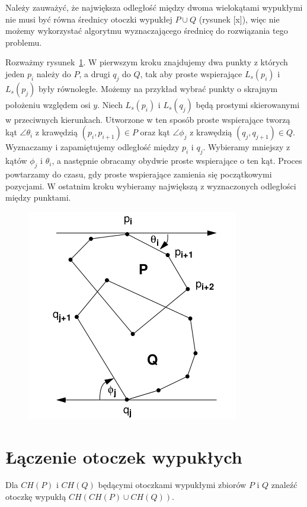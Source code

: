 Należy zauważyć, że największa odległość między dwoma wielokątami
wypukłymi nie musi być równa średnicy otoczki wypukłej $P \cup Q$
(rysunek [x]), więc nie możemy wykorzystać algorytmu wyznaczającego
średnicę do rozwiązania tego problemu.

Rozważmy rysunek~\ref{img:calipers3}. W pierwszym kroku znajdujemy dwa
punkty z których jeden $p_i$ należy do $P$, a drugi $q_j$ do $Q$, tak
aby proste wspierające $L_s(p_i)$ i $L_s(p_j)$ były równoległe. Możemy
na przykład wybrać punkty o skrajnym położeniu względem osi $y$. Niech
$L_s(p_i)$ i $L_s(q_j)$ będą prostymi skierowanymi w przeciwnych
kierunkach. Utworzone w ten sposób proste wspierające tworzą kąt
$\angle{\theta_i}$ z krawędzią $(p_i, p_{i+1}) \in P$ oraz kąt
$\angle{\phi_j}$ z krawędzią $(q_j, q_{j+1}) \in Q$. Wyznaczamy i
zapamiętujemy odległość między $p_i$ i $q_j$. Wybieramy mniejszy z
kątów $\phi_j$ i $\theta_i$, a następnie obracamy obydwie proste
wspierające o ten kąt. Proces powtarzamy do czasu, gdy proste
wspierające zamienia się początkowymi pozycjami. W ostatnim kroku
wybieramy największą z wyznaczonych odległości między punktami.

\begin{figure}[htb]
  \centering
  \includegraphics[scale=0.5]{img/calipers3}
  \caption{\label{img:calipers3}}
\end{figure}

\section{Łączenie otoczek wypukłych}
\begin{problem}
  Dla $CH(P)$ i $CH(Q)$ będącymi otoczkami wypukłymi zbiorów $P$ i
  $Q$ znaleźć otoczkę wypukłą $CH(CH(P) \cup CH(Q))$.
\end{problem}

